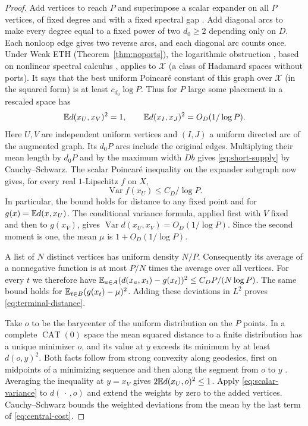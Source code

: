 \begin{proof}
Add vertices to reach $P$ and superimpose a scalar expander on all $P$
vertices, of fixed degree and with a fixed spectral gap \cite{HLW,Friedman}.
Add diagonal arcs to make every degree equal to a fixed power of two
$d_0\ge2$ depending only on $D$. Each nonloop edge gives two reverse arcs, and each diagonal arc
counts once.
Under Weak ETH (Theorem~\ref{thm:noports}), the logarithmic obstruction
\cite[Theorem~]{oaP}, based on
nonlinear spectral calculus \cite{MN}, applies to $\mathcal X$
(a class of Hadamard spaces without ports).
It says that the best uniform Poincar\'e constant of
this graph over $\mathcal X$ (in the squared form)
is at least
$c_{d_0}\log P$. Thus for $P$ large some placement in a rescaled space has
\[
 \mathbb E d(x_U,x_V)^2=1,\qquad
 \mathbb E d(x_I,x_J)^2=O_D(1/\log P).
\]
Here $U,V$ are independent uniform vertices and $(I,J)$ a uniform
directed arc of the augmented graph. Its $d_0P$ arcs include the
original edges. Multiplying their mean length by $d_0P$ and by the
maximum width $Db$ gives \eqref{eq:short-supply} by Cauchy--Schwarz.
The scalar Poincar\'e
inequality on the expander subgraph now gives, for every real
$1$-Lipschitz $f$ on $X$,
\begin{equation}\label{eq:scalar-variance}
 \operatorname{Var} f(x_U)\le C_D/\log P.
\end{equation}
In particular, the bound holds for distance to any fixed point and for
$g(x)=\mathbb E d(x,x_U)$. The conditional variance formula, applied first with
$V$ fixed and then to $g(x_V)$, gives
$\operatorname{Var}d(x_U,x_V)=O_D(1/\log P)$. Since the second moment
is one, the mean $\mu$ is $1+O_D(1/\log P)$.

A list of $N$ distinct vertices has uniform density $N/P$.
Consequently its average of a nonnegative function is at most $P/N$
times the average over all vertices. For every $t$ we therefore have
$\mathbb E_{a\in A}(d(x_a,x_t)-g(x_t))^2\le C_D P/(N\log P)$.
The same bound holds for $\mathbb E_{t\in B}(g(x_t)-\mu)^2$.
Adding these deviations in $L^2$ proves \eqref{eq:terminal-distance}.

Take $o$ to be the barycenter of the uniform distribution on the $P$
points. In a complete $\operatorname{CAT}(0)$ space the mean squared
distance to a finite distribution has a unique minimizer $o$, and its
value at $y$ exceeds its minimum by at least $d(o,y)^2$.
Both facts follow from strong convexity along geodesics, first on
midpoints of a minimizing sequence and then along the segment from
$o$ to $y$ \cite{BH,Sturm}. Averaging the inequality at $y=x_V$ gives
$2\mathbb E d(x_U,o)^2\le1$. Apply \eqref{eq:scalar-variance} to $d(\,\cdot\,,o)$
and extend the weights by zero to the added vertices. Cauchy--Schwarz
bounds the weighted deviations from the mean by the last term of
\eqref{eq:central-cost}.
\end{proof}


